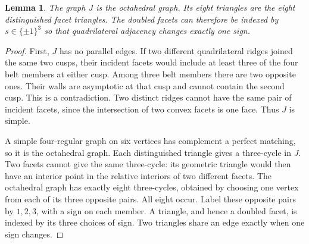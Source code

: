 \documentclass[11pt]{article}
\newtheorem{lemma}[theorem]{Lemma}
\theoremstyle{remark}
\begin{document}
\begin{lemma}\label{lem:graph}
The graph $J$ is the octahedral graph. Its eight triangles are the
eight distinguished facet triangles. The doubled facets can
therefore be indexed by $s\in\{\pm1\}^3$ so that quadrilateral
adjacency changes exactly one sign.
\end{lemma}
\begin{proof}
First, $J$ has no parallel edges. If two different quadrilateral
ridges joined the same two cusps, their incident facets would
include at least three of the four belt members at either cusp.
Among three belt members there are two opposite ones. Their walls
are asymptotic at that cusp and cannot contain the second cusp.
This is a contradiction. Two distinct ridges cannot have the same
pair of incident facets, since the intersection of two convex
facets is one face. Thus $J$ is simple.

A simple four-regular graph on six vertices has complement a
perfect matching, so it is the octahedral graph. Each distinguished
triangle gives a three-cycle in $J$. Two facets cannot give the
same three-cycle: its geometric triangle would then have an
interior point in the relative interiors of two different facets.
The octahedral graph has exactly eight three-cycles, obtained by
choosing one vertex from each of its three opposite pairs. All
eight occur. Label these opposite pairs by $1,2,3$, with a sign
on each member. A triangle, and hence a doubled facet, is indexed
by its three choices of sign. Two triangles share an edge exactly
when one sign changes.
\end{proof}
\end{document}
